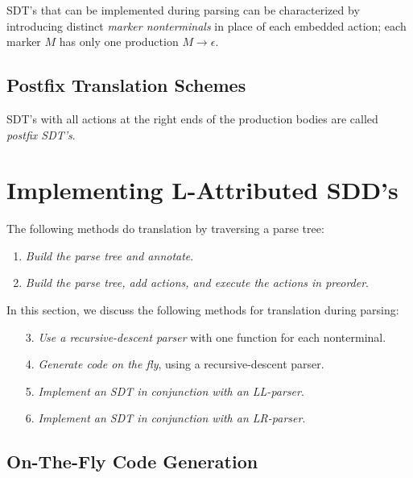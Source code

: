 \documentclass[12pt,a4paper,twoside,openany]{book}
\begin{document}
SDT's that can be implemented during parsing can be characterized by introducing distinct \textit{marker nonterminals} in place of each embedded action; each marker $M$ has only one production $M\rightarrow\epsilon$.

\subsection{Postfix Translation Schemes}

SDT's with all actions at the right ends of the production bodies are called \textit{postfix SDT's}.

\section{Implementing L-Attributed SDD's}

The following methods do translation by traversing a parse tree:
\begin{enumerate}
    \item \textit{Build the parse tree and annotate}.
    \item \textit{Build the parse tree, add actions, and execute the actions in preorder}.
\end{enumerate}
In this section, we discuss the following methods for translation during parsing:
\begin{itemize}
    \item [3.]\textit{Use a recursive-descent parser} with one function for each nonterminal.
    \item [4.]\textit{Generate code on the fly}, using a recursive-descent parser.
    \item [5.]\textit{Implement an SDT in conjunction with an LL-parser}.
    \item [6.]\textit{Implement an SDT in conjunction with an LR-parser}.
\end{itemize}

\subsection{On-The-Fly Code Generation}
\end{document}
